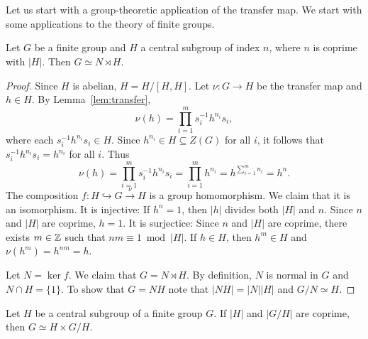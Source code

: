 \chapter{}


Let us start with a group-theoretic application
of the transfer map. We start with some applications to the theory 
of finite groups. 

\begin{proposition}
	\label{prop:semidirecto}
	Let $G$ be a finite group and $H$ a central subgroup of index $n$, where 
	$n$ is coprime with $|H|$. Then
	$G\simeq N\rtimes H$.
\end{proposition}

\begin{proof}
	Since $H$ is abelian, $H=H/[H,H]$. Let  
	$\nu\colon G\to H$ be the transfer map and $h\in H$. 
	By Lemma~\ref{lem:transfer}, 
	\[
		\nu(h)
		=\prod_{i=1}^m s_i^{-1}h^{n_i}s_i,
	\]
	where each $s_i^{-1}h^{n_i}s_i\in H$. Since 
	$h^{n_i}\in H\subseteq Z(G)$ for all $i$, it follows that 
	$s_i^{-1}h^{n_i}s_i=h^{n_i}$ for all $i$. Thus 
	\[
		\nu(h)
		=\prod_{i=1}^m s_i^{-1}h^{n_i}s_i
		=\prod_{i=1}^mh^{n_i}
		=h^{\sum_{i=1}^m n_i}=h^n.
	\] 
	The composition $f\colon H\hookrightarrow G\xrightarrow{\nu} H$ is a group homomorphism. 
	We claim that it is an isomorphism. It is injective: If $h^n=1$, then 
	$|h|$ divides both $|H|$ and $n$. Since $n$ and $|H|$ are
	coprime, $h=1$. It is surjectice: Since $n$ and $|H|$ are coprime, there exists 
	$m\in\mathbb{Z}$ such that $nm\equiv 1\bmod |H|$. If $h\in H$, then $h^m\in
	H$ and $\nu(h^m)=h^{nm}=h$. 
	
	Let $N=\ker f$. We claim that $G=N\rtimes H$. 
	By definition, $N$ is normal in $G$ and $N\cap
	H=\{1\}$. To show that $G=NH$ note that 
	$|NH|=|N||H|$ and $G/N\simeq H$.
\end{proof}

\begin{exercise}
	Let $H$ be a central subgroup of a finite group $G$. If $|H|$
	and $|G/H|$ are coprime, then $G\simeq H\times G/H$.
\end{exercise}



